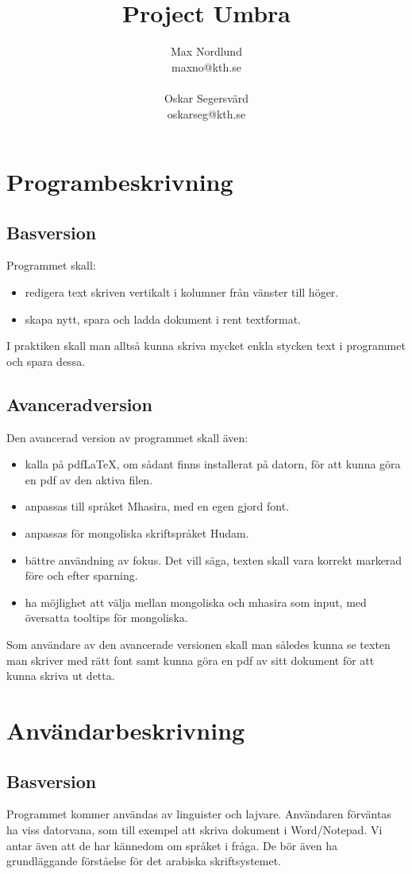 \documentclass[a4paper,11p,twoside]{report}
\title{Project Umbra}
\author{Max Nordlund\\ maxno@kth.se \\ \\ Oskar Segersvärd \\ oskarseg@kth.se}
\begin{document}
\maketitle

\pagebreak

\section{Programbeskrivning}
\subsection{Basversion}
Programmet skall:
\begin{itemize}
	\item redigera text skriven vertikalt i kolumner från vänster till höger.
	\item skapa nytt, spara och ladda dokument i rent textformat.
\end{itemize}
I praktiken skall man alltså kunna skriva mycket enkla stycken text i programmet och spara dessa.

\subsection{Avanceradversion}
Den avancerad version av programmet skall även:
\begin{itemize}
	\item kalla på pdf\LaTeX, om sådant finns installerat på datorn, för att kunna göra en pdf av den aktiva filen.
	\item anpassas till språket Mhasira, med en egen gjord font.
	\item anpassas för mongoliska skriftspråket Hudam.
	\item bättre användning av fokus. Det vill säga, texten skall vara korrekt markerad före och efter sparning.
	\item ha möjlighet att välja mellan mongoliska och mhasira som input, med översatta tooltips för mongoliska.
\end{itemize}
Som användare av den avancerade versionen skall man således kunna se texten man skriver med rätt font samt kunna göra en pdf av sitt dokument för att kunna skriva ut detta.

\section{Användarbeskrivning}
\subsection{Basversion}
Programmet kommer användas av linguister och lajvare. Användaren förväntas ha viss datorvana, som till exempel att skriva dokument i Word/Notepad. Vi antar även att de har kännedom om språket i fråga. De bör även ha grundläggande förståelse för det arabiska skriftsystemet. 
\end{document}
